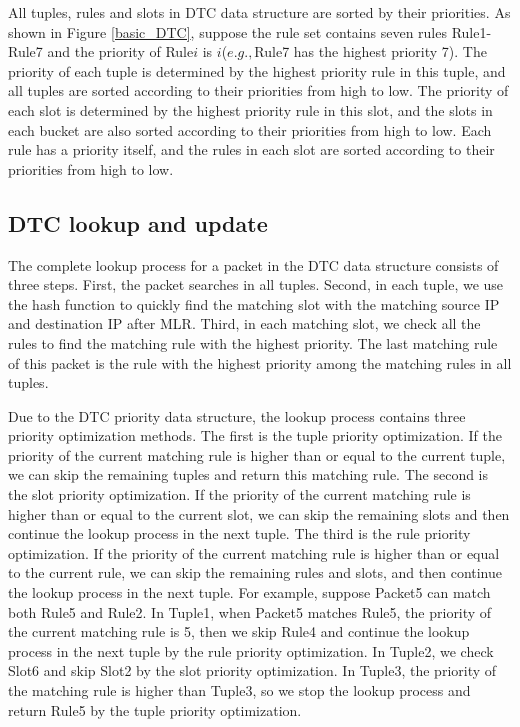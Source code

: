 All tuples, rules and slots in DTC data structure are sorted by their priorities. As shown in Figure \ref{basic_DTC}, suppose the rule set contains seven rules Rule1-Rule7 and the priority of Rule$i$ is $i$($e.g.,$Rule7 has the highest priority 7). The priority of each tuple is determined by the highest priority rule in this tuple, and all tuples are sorted according to their priorities from high to low. The priority of each slot is determined by the highest priority rule in this slot, and the slots in each bucket are also sorted according to their priorities from high to low. Each rule has a priority itself, and the rules in each slot are sorted according to their priorities from high to low.

\subsection{DTC lookup and update}
The complete lookup process for a packet in the DTC data structure consists of three steps. First, the packet searches in all tuples. Second, in each tuple, we use the hash function to quickly find the matching slot with the matching source IP and destination IP after MLR. Third, in each matching slot, we check all the rules to find the matching rule with the highest priority. The last matching rule of this packet is the rule with the highest priority among the matching rules in all tuples.

Due to the DTC priority data structure, the lookup process contains three priority optimization methods. The first is the tuple priority optimization. If the priority of the current matching rule is higher than or equal to the current tuple, we can skip the remaining tuples and return this matching rule. The second is the slot priority optimization. If the priority of the current matching rule is higher than or equal to the current slot, we can skip the remaining slots and then continue the lookup process in the next tuple. The third is the rule priority optimization. If the priority of the current matching rule is higher than or equal to the current rule, we can skip the remaining rules and slots, and then continue the lookup process in the next tuple. For example, suppose Packet5 can match both Rule5 and Rule2. In Tuple1, when Packet5 matches Rule5, the priority of the current matching rule is 5, then we skip Rule4 and continue the lookup process in the next tuple by the rule priority optimization. In Tuple2, we check Slot6 and skip Slot2 by the slot priority optimization. In Tuple3, the priority of the matching rule is higher than Tuple3, so we stop the lookup process and return Rule5 by the tuple priority optimization.

